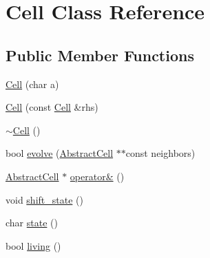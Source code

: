 \hypertarget{classCell}{\section{Cell Class Reference}
\label{classCell}
}
\subsection*{Public Member Functions}
\begin{DoxyCompactItemize}
\item 
\hyperlink{classCell_a297c04746ff5d676b6814c66d4a7cd5f}{Cell} (char a)
\item 
\hyperlink{classCell_a93fb42df05d8c92468799093c527e5f1}{Cell} (const \hyperlink{classCell}{Cell} \&rhs)
\item 
\hyperlink{classCell_a9fa559f7a28e2b4336c6879ca09304d8}{$\sim$\-Cell} ()
\item 
bool \hyperlink{classCell_a8f5886fbfafc044567b320b30f5b7cfa}{evolve} (\hyperlink{classAbstractCell}{Abstract\-Cell} $\ast$$\ast$const neighbors)
\item 
\hyperlink{classAbstractCell}{Abstract\-Cell} $\ast$ \hyperlink{classCell_adacf5a139b7a3521ec8bec7817476997}{operator\&} ()
\item 
void \hyperlink{classCell_a04ea1962372996c88fd00e6bc2fb815d}{shift\-\_\-state} ()
\item 
char \hyperlink{classCell_a5ef815a51cac8abe3280c986aa95e5f7}{state} ()
\item 
bool \hyperlink{classCell_aa2694791e33edaa1f9cbc2c0d7897b92}{living} ()
\end{DoxyCompactItemize}


